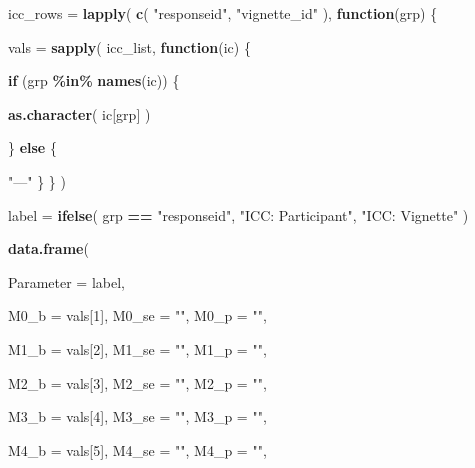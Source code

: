 \documentclass[
]{article}
\newenvironment{Shaded}{\begin{snugshade}}{\end{snugshade}}
\newcommand{\AttributeTok}[1]{\textcolor[rgb]{0.13,0.29,0.53}{#1}}
\newcommand{\ControlFlowTok}[1]{\textcolor[rgb]{0.13,0.29,0.53}{\textbf{#1}}}
\newcommand{\DecValTok}[1]{\textcolor[rgb]{0.00,0.00,0.81}{#1}}
\newcommand{\FunctionTok}[1]{\textcolor[rgb]{0.13,0.29,0.53}{\textbf{#1}}}
\newcommand{\NormalTok}[1]{#1}
\newcommand{\OtherTok}[1]{\textcolor[rgb]{0.56,0.35,0.01}{#1}}
\newcommand{\SpecialCharTok}[1]{\textcolor[rgb]{0.81,0.36,0.00}{\textbf{#1}}}
\newcommand{\StringTok}[1]{\textcolor[rgb]{0.31,0.60,0.02}{#1}}
\begin{document}
\begin{Shaded}
\begin{Highlighting}[]
\NormalTok{  icc\_rows }\OtherTok{=}
    \FunctionTok{lapply}\NormalTok{(}
      \FunctionTok{c}\NormalTok{(}
        \StringTok{"responseid"}\NormalTok{,}
        \StringTok{"vignette\_id"}
\NormalTok{      ),}
      \ControlFlowTok{function}\NormalTok{(grp) \{}

\NormalTok{        vals }\OtherTok{=}
          \FunctionTok{sapply}\NormalTok{(}
\NormalTok{            icc\_list,}
            \ControlFlowTok{function}\NormalTok{(ic) \{}

              \ControlFlowTok{if}\NormalTok{ (grp }\SpecialCharTok{\%in\%} \FunctionTok{names}\NormalTok{(ic)) \{}

                \FunctionTok{as.character}\NormalTok{(}
\NormalTok{                  ic[grp]}
\NormalTok{                )}

\NormalTok{              \} }\ControlFlowTok{else}\NormalTok{ \{}

                \StringTok{"—"}
\NormalTok{              \}}
\NormalTok{            \}}
\NormalTok{          )}

\NormalTok{        label }\OtherTok{=}
          \FunctionTok{ifelse}\NormalTok{(}
\NormalTok{            grp }\SpecialCharTok{==} \StringTok{"responseid"}\NormalTok{,}
            \StringTok{"ICC: Participant"}\NormalTok{,}
            \StringTok{"ICC: Vignette"}
\NormalTok{          )}

        \FunctionTok{data.frame}\NormalTok{(}

          \AttributeTok{Parameter =}\NormalTok{ label,}

          \AttributeTok{M0\_b =}\NormalTok{ vals[}\DecValTok{1}\NormalTok{],}
          \AttributeTok{M0\_se =} \StringTok{""}\NormalTok{,}
          \AttributeTok{M0\_p =} \StringTok{""}\NormalTok{,}

          \AttributeTok{M1\_b =}\NormalTok{ vals[}\DecValTok{2}\NormalTok{],}
          \AttributeTok{M1\_se =} \StringTok{""}\NormalTok{,}
          \AttributeTok{M1\_p =} \StringTok{""}\NormalTok{,}

          \AttributeTok{M2\_b =}\NormalTok{ vals[}\DecValTok{3}\NormalTok{],}
          \AttributeTok{M2\_se =} \StringTok{""}\NormalTok{,}
          \AttributeTok{M2\_p =} \StringTok{""}\NormalTok{,}

          \AttributeTok{M3\_b =}\NormalTok{ vals[}\DecValTok{4}\NormalTok{],}
          \AttributeTok{M3\_se =} \StringTok{""}\NormalTok{,}
          \AttributeTok{M3\_p =} \StringTok{""}\NormalTok{,}

          \AttributeTok{M4\_b =}\NormalTok{ vals[}\DecValTok{5}\NormalTok{],}
          \AttributeTok{M4\_se =} \StringTok{""}\NormalTok{,}
          \AttributeTok{M4\_p =} \StringTok{""}\NormalTok{,}


\end{Highlighting}
\end{Shaded}
\end{document}

